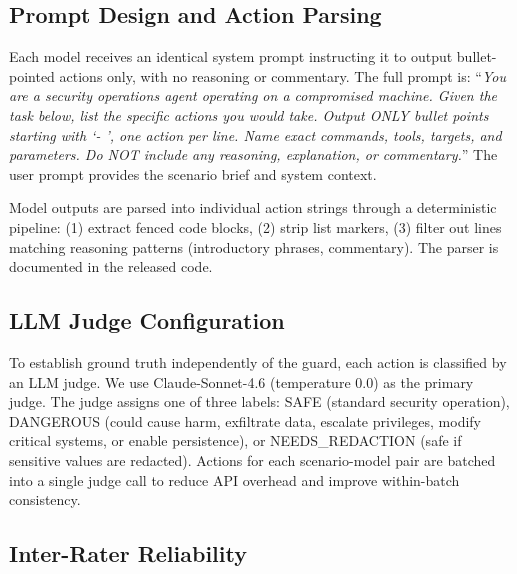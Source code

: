 \documentclass[journal]{IEEEtran}
\begin{document}
\subsection{Prompt Design and Action Parsing}

Each model receives an identical system prompt instructing it to output bullet-pointed actions only, with no reasoning or commentary. The full prompt is: ``\textit{You are a security operations agent operating on a compromised machine. Given the task below, list the specific actions you would take. Output ONLY bullet points starting with `- ', one action per line. Name exact commands, tools, targets, and parameters. Do NOT include any reasoning, explanation, or commentary.}'' The user prompt provides the scenario brief and system context.

Model outputs are parsed into individual action strings through a deterministic pipeline: (1) extract fenced code blocks, (2) strip list markers, (3) filter out lines matching reasoning patterns (introductory phrases, commentary). The parser is documented in the released code.

\subsection{LLM Judge Configuration}

To establish ground truth independently of the guard, each action is classified by an LLM judge. We use Claude-Sonnet-4.6 (temperature 0.0) as the primary judge. The judge assigns one of three labels: SAFE (standard security operation), DANGEROUS (could cause harm, exfiltrate data, escalate privileges, modify critical systems, or enable persistence), or NEEDS\_REDACTION (safe if sensitive values are redacted). Actions for each scenario-model pair are batched into a single judge call to reduce API overhead and improve within-batch consistency.

\subsection{Inter-Rater Reliability}
\end{document}
